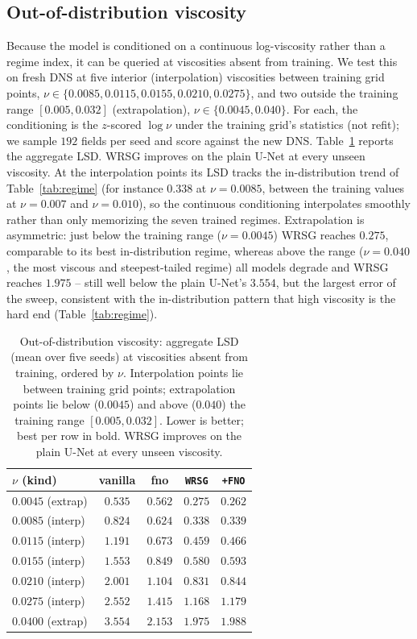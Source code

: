 \documentclass[10pt]{article} %
\begin{document}
\subsection{Out-of-distribution viscosity}
\label{sec:ood}

Because the model is conditioned on a continuous log-viscosity rather than a regime index, it can be queried at viscosities absent from training. We test this on fresh DNS at five interior (interpolation) viscosities between training grid points, $\nu \in \{0.0085, 0.0115, 0.0155, 0.0210, 0.0275\}$, and two outside the training range $[0.005, 0.032]$ (extrapolation), $\nu \in \{0.0045, 0.040\}$. For each, the conditioning is the $z$-scored $\log\nu$ under the training grid's statistics (not refit); we sample $192$ fields per seed and score against the new DNS. Table~\ref{tab:ood} reports the aggregate LSD. WRSG improves on the plain U-Net at every unseen viscosity. At the interpolation points its LSD tracks the in-distribution trend of Table~\ref{tab:regime} (for instance $0.338$ at $\nu=0.0085$, between the training values at $\nu=0.007$ and $\nu=0.010$), so the continuous conditioning interpolates smoothly rather than only memorizing the seven trained regimes. Extrapolation is asymmetric: just below the training range ($\nu=0.0045$) WRSG reaches $0.275$, comparable to its best in-distribution regime, whereas above the range ($\nu=0.040$, the most viscous and steepest-tailed regime) all models degrade and WRSG reaches $1.975$ -- still well below the plain U-Net's $3.554$, but the largest error of the sweep, consistent with the in-distribution pattern that high viscosity is the hard end (Table~\ref{tab:regime}).

\begin{table}[H]
\centering
\caption{Out-of-distribution viscosity: aggregate LSD (mean over five seeds) at viscosities absent from training, ordered by $\nu$. Interpolation points lie between training grid points; extrapolation points lie below ($0.0045$) and above ($0.040$) the training range $[0.005, 0.032]$. Lower is better; best per row in bold. WRSG improves on the plain U-Net at every unseen viscosity.}
\label{tab:ood}
\begin{tabular}{lcccc}
\toprule
$\nu$ (kind) & vanilla & fno & \texttt{WRSG} & \texttt{+FNO} \\
\midrule
$0.0045$ (extrap) & $0.535$ & $0.562$ & $0.275$ & $\mathbf{0.262}$ \\
$0.0085$ (interp) & $0.824$ & $0.624$ & $\mathbf{0.338}$ & $0.339$ \\
$0.0115$ (interp) & $1.191$ & $0.673$ & $\mathbf{0.459}$ & $0.466$ \\
$0.0155$ (interp) & $1.553$ & $0.849$ & $\mathbf{0.580}$ & $0.593$ \\
$0.0210$ (interp) & $2.001$ & $1.104$ & $\mathbf{0.831}$ & $0.844$ \\
$0.0275$ (interp) & $2.552$ & $1.415$ & $\mathbf{1.168}$ & $1.179$ \\
$0.0400$ (extrap) & $3.554$ & $2.153$ & $\mathbf{1.975}$ & $1.988$ \\
\bottomrule
\end{tabular}
\end{table}
\end{document}
